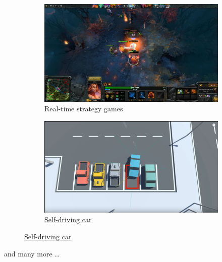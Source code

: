 \documentclass[10pt]{beamer}
\theoremstyle{remark}
\begin{document}
\begin{frame}
\begin{figure}[h]
        \begin{subfigure}[t]{0.4\textwidth}
            \includegraphics[width=\textwidth]{figures/motivation3.jpg}
            \caption{Real-time strategy games}
        \end{subfigure}
        \begin{subfigure}[t]{0.4\textwidth}
            \includegraphics[width=\textwidth]{figures/motivation4.png}
            \caption{\href{https://www.youtube.com/watch?v=VMp6pq6_QjI&t=0s}{Self-driving car}}
        \end{subfigure}
    \end{figure}
    and many more \ldots 
\end{frame}
\end{document}
